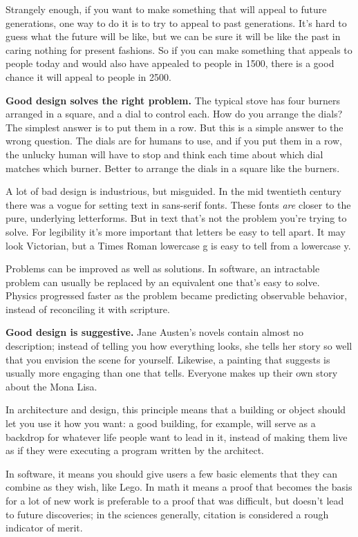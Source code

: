 \documentclass[12pt]{book}
\begin{document}
Strangely enough, if you want to make something that will appeal to
future generations, one way to do it is to try to appeal to past
generations. It's hard to guess what the future will be like, but we can
be sure it will be like the past in caring nothing for present fashions.
So if you can make something that appeals to people today and would also
have appealed to people in 1500, there is a good chance it will appeal
to people in 2500.

\textbf{Good design solves the right problem.} The typical stove has
four burners arranged in a square, and a dial to control each. How do
you arrange the dials? The simplest answer is to put them in a row. But
this is a simple answer to the wrong question. The dials are for humans
to use, and if you put them in a row, the unlucky human will have to
stop and think each time about which dial matches which burner. Better
to arrange the dials in a square like the burners.

A lot of bad design is industrious, but misguided. In the mid twentieth
century there was a vogue for setting text in sans-serif fonts. These
fonts \emph{are} closer to the pure, underlying letterforms. But in text
that's not the problem you're trying to solve. For legibility it's more
important that letters be easy to tell apart. It may look Victorian, but
a Times Roman lowercase g is easy to tell from a lowercase y.

Problems can be improved as well as solutions. In software, an
intractable problem can usually be replaced by an equivalent one that's
easy to solve. Physics progressed faster as the problem became
predicting observable behavior, instead of reconciling it with
scripture.

\textbf{Good design is suggestive.} Jane Austen's novels contain almost
no description; instead of telling you how everything looks, she tells
her story so well that you envision the scene for yourself. Likewise, a
painting that suggests is usually more engaging than one that tells.
Everyone makes up their own story about the Mona Lisa.

In architecture and design, this principle means that a building or
object should let you use it how you want: a good building, for example,
will serve as a backdrop for whatever life people want to lead in it,
instead of making them live as if they were executing a program written
by the architect.

In software, it means you should give users a few basic elements that
they can combine as they wish, like Lego. In math it means a proof that
becomes the basis for a lot of new work is preferable to a proof that
was difficult, but doesn't lead to future discoveries; in the sciences
generally, citation is considered a rough indicator of merit.
\end{document}

